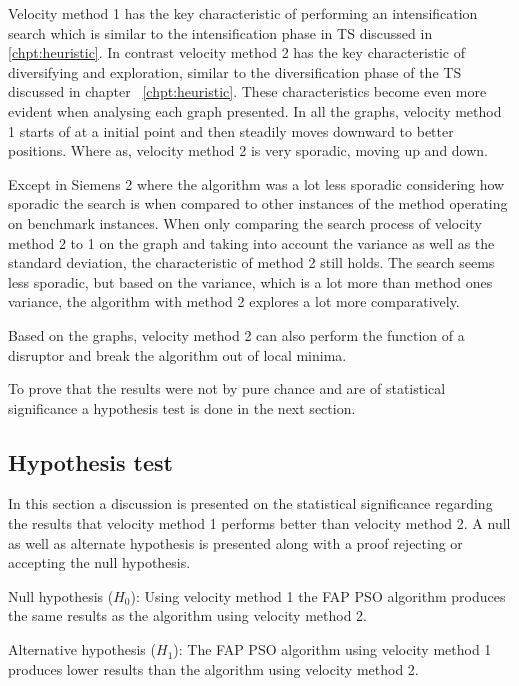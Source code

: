 Velocity method 1 has the key characteristic of performing an intensification search which is similar to the intensification phase in \gls{TS} discussed in \ref{chpt:heuristic}. In contrast velocity method 2 has the key characteristic of diversifying and exploration, similar to the diversification phase of the \gls{TS} discussed in chapter ~\ref{chpt:heuristic}. These characteristics become even more evident when analysing each graph presented. In all the graphs, velocity method 1 starts of at a initial point and then steadily moves downward to better positions. Where as, velocity method 2 is very sporadic, moving up and down. 

Except in Siemens 2 where the algorithm was a lot less sporadic considering how sporadic the search is when compared to other instances of the method operating on benchmark instances. When only comparing the search process of velocity method 2 to 1 on the graph and taking into account the variance as well as the standard deviation, the characteristic of method 2 still holds. The search seems less sporadic, but based on the variance, which is a lot more than method ones variance, the algorithm with method 2 explores a lot more comparatively.

Based on the graphs, velocity method 2 can also perform the function of a disruptor and break the algorithm out of local minima.

To prove that the results were not by pure chance and are of statistical significance a hypothesis test is done in the next section.
\subsection{Hypothesis test}
In this section a discussion is presented on the statistical significance regarding the results that velocity method 1 performs better than velocity method 2. A null as well as alternate hypothesis is presented along with a proof rejecting or accepting the null hypothesis.

Null hypothesis ($H_0$): Using velocity method 1 the FAP PSO algorithm produces the same results as the algorithm using velocity method 2.

Alternative hypothesis ($H_1$): The FAP PSO algorithm using velocity method 1 produces lower results than the algorithm using velocity method 2.

